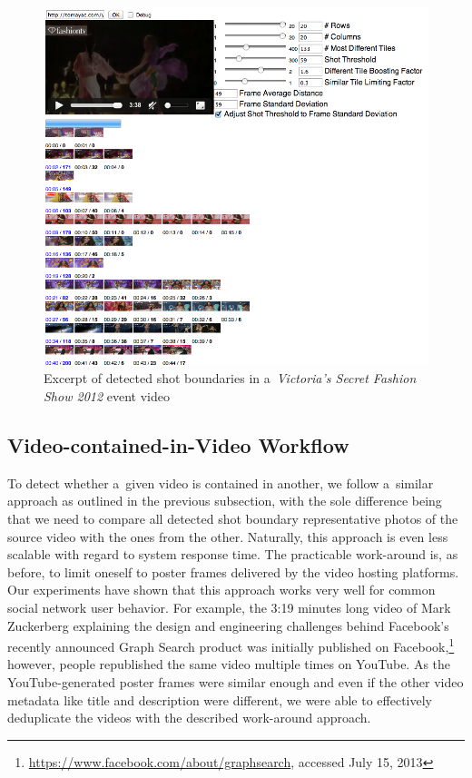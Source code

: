 \begin{figure}[!h]
  \centering
  \includegraphics[width=1.0\linewidth]{./vsfashionshowboundaries.png}
  \caption[Excerpt of detected shot boundaries in an event video]
  {Excerpt of detected shot boundaries in a~\emph{Victoria's Secret Fashion Show 2012} event video}
  \label{fig:vsfashionshowboundaries}
\end{figure}

\subsection{Video-contained-in-Video Workflow}

To detect whether a~given video is contained in another,
we follow a~similar approach as outlined in the previous subsection,
with the sole difference being that we need to compare
all detected shot boundary representative photos of the source video
with the ones from the other.
Naturally, this approach is even less scalable
with regard to system response time.
The practicable work-around is, as before, to limit oneself
to poster frames delivered by the video hosting platforms.
Our experiments have shown that this approach works very well
for common social network user behavior.
For example, the 3:19 minutes long video of Mark Zuckerberg explaining
the design and engineering challenges behind Facebook's
recently announced Graph Search product was initially published
on Facebook,\footnote{\url{https://www.facebook.com/about/graphsearch},
accessed July 15, 2013} however, people republished the same video 
multiple times on YouTube.
As the YouTube-generated poster frames were similar enough
and even if the other video metadata like title and description
were different, we were able to effectively deduplicate the videos
with the described work-around approach.

